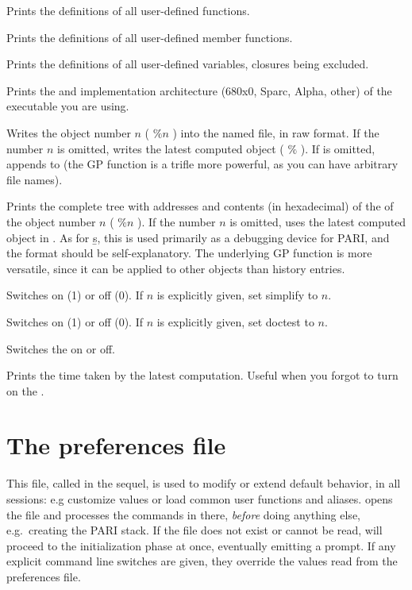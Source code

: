  Prints the definitions of all user-defined functions.

 Prints the definitions of all user-defined member functions.

 Prints the definitions of all user-defined variables,
closures being excluded.

 Prints the  and implementation architecture
(680x0, Sparc, Alpha, other) of the  executable you are using.

 Writes the object number
$n$ ( $\%n$ ) into the named file, in raw format. If the number $n$ is
omitted, writes the latest computed object ( $\%$ ). If  is
omitted, appends to  (the GP function  is a trifle more
powerful, as you can have arbitrary file names).

 Prints the complete tree with addresses and contents
(in hexadecimal) of the  of the object number
$n$ ( $\%n$ ). If the number $n$ is omitted, uses the latest computed object
in . As for \b{s}, this is used primarily as a debugging device for
PARI, and the format should be self-explanatory. The underlying GP
function  is more versatile, since it can be applied to other
objects than history entries.

 Switches  on (1) or off (0). If $n$
is explicitly given, set simplify to $n$.

 Switches  on (1) or off (0). If $n$
is explicitly given, set doctest to $n$.

\subseckbd{\#} Switches the  on or off.

\subseckbd{\#\#} Prints the time taken by the latest computation.
Useful when you forgot to turn on the .

\section{The preferences file}
\label{se:gprc}

This file, called  in the sequel, is used to modify or extend
 default behavior, in all  sessions: e.g customize
 values or load common user functions and aliases. 
opens the  file and processes the commands in there, \emph{before}
doing anything else, e.g.~creating the PARI stack. If the file does not exist
or cannot be read,  will proceed to the initialization phase at once,
eventually emitting a prompt. If any explicit command line switches are
given, they override the values read from the preferences file.

